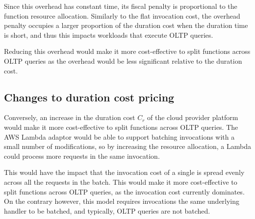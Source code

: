 Since this overhead has constant time, its fiscal penalty is proportional to the function resource allocation. Similarly to the flat invocation cost, the overhead penalty occupies a larger proportion of the duration cost when the duration time is short, and thus this impacts workloads that execute OLTP queries.

Reducing this overhead would make it more cost-effective to split functions across OLTP queries as the overhead would be less significant relative to the duration cost.

\subsection{Changes to duration cost pricing}
Conversely, an increase in the duration cost $C_r$ of the cloud provider platform would make it more cost-effective to split functions across OLTP queries. The \faaasc{} AWS Lambda adaptor would be able to support batching invocations with a small number of modifications, so by increasing the resource allocation, a Lambda could process more requests in the same invocation.

This would have the impact that the invocation cost of a single is spread evenly across all the requests in the batch. This would make it more cost-effective to split functions across OLTP queries, as the invocation cost currently dominates. On the contrary however, this model requires invocations the same underlying handler to be batched, and typically, OLTP queries are not batched.
